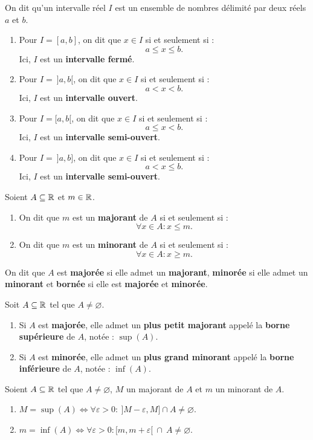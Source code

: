\begin{definition}
    On dit qu'un intervalle réel $I$ est un ensemble de nombres délimité par deux réels $a$ et $b$.
    \begin{enumerate}
    	\item Pour $I = [a, b]$, on dit que $x \in I$ si et seulement si :
    	\[ a \leq x \leq b. \]
    	Ici, $I$ est un \textbf{intervalle fermé}.
    	\item Pour $I = \ ]a, b[$, on dit que $x \in I$ si et seulement si :
    	\[ a < x < b. \]
    	Ici, $I$ est un \textbf{intervalle ouvert}.
    	\item Pour $I = [a, b[$, on dit que $x \in I$ si et seulement si : 
    	\[ a \leq x < b. \]
    	Ici, $I$ est un \textbf{intervalle semi-ouvert}.
    	\item Pour $I = \ ]a, b]$, on dit que $x \in I$ si et seulement si :
    	\[ a < x \leq b. \]
    	Ici, $I$ est un \textbf{intervalle semi-ouvert}.
    \end{enumerate}
\end{definition}

\begin{definition}
    Soient $A \subseteq \mathbb{R}$ et $m \in \mathbb{R}$.
    \begin{enumerate}
        \item On dit que $m$ est un \textbf{majorant} de $A$ si et seulement si :
        \[ \forall x \in A : x \leq m. \]
        \item On dit que $m$ est un \textbf{minorant} de $A$ si et seulement si :
        \[ \forall x \in A : x \geq m. \]
    \end{enumerate}
    On dit que $A$ est \textbf{majorée} si elle admet un \textbf{majorant}, \textbf{minorée} si elle admet un \textbf{minorant} et \textbf{bornée} si elle est \textbf{majorée} et \textbf{minorée}.
\end{definition}

\begin{theorem}
    Soit $A \subseteq \mathbb{R}$ tel que $A \neq \varnothing$. 
    \begin{enumerate}
    	\item Si $A$ est \textbf{majorée}, elle admet un \textbf{plus petit majorant} appelé la \textbf{borne supérieure} de $A$, notée : $\sup(A)$.
    	\item Si $A$ est \textbf{minorée}, elle admet un \textbf{plus grand minorant} appelé la \textbf{borne inférieure} de $A$, notée : $\inf(A)$.
    \end{enumerate}
\end{theorem}

\begin{proposition}
    Soient $A \subseteq \mathbb{R}$ tel que $A \neq \varnothing$, $M$ un majorant de $A$ et $m$ un minorant de $A$.  
    \begin{enumerate}
        \item $M = \sup(A) \iff \forall \varepsilon > 0 : \ ]M - \varepsilon, M] \cap A \neq \varnothing$.
        \item $m = \inf(A) \iff \forall \varepsilon > 0 : [m, m + \varepsilon[ \ \cap \ A \neq \varnothing $.
    \end{enumerate}
\end{proposition}